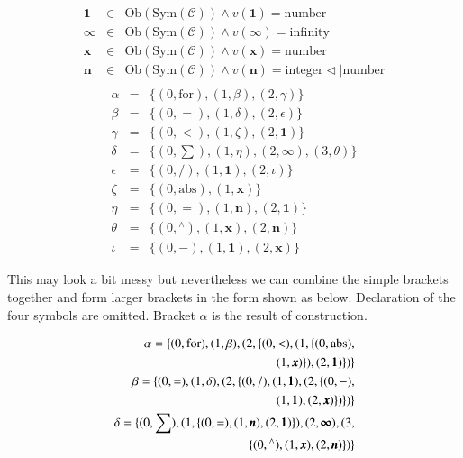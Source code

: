 \documentclass{aims}
\numberwithin{equation}{section}
\numberwithin{theorem}{section}	%
\numberwithin{axiom}{section}	%
\numberwithin{definition}{section}	%
\begin{document}
	\begin{equation*}
		\begin{aligned}
			\pmb{1} &\in& \text{Ob}(\text{Sym}(\mathcal{C}))\land \mathit{v}(\pmb{1})=\text{number}\\
			\pmb{\infty } &\in& \text{Ob}(\text{Sym}(\mathcal{C}))\land \mathit{v}(\pmb{\infty })=\text{infinity}\\
			\pmb{x} &\in& \text{Ob}(\text{Sym}(\mathcal{C}))\land \mathit{v}(\pmb{x})=\text{number}\\
			\pmb{n} &\in& \text{Ob}(\text{Sym}(\mathcal{C}))\land \mathit{v}(\pmb{n})=\text{integer}\triangleleft |\text{number}\\
		\end{aligned}
	\end{equation*}
	\begin{equation*}
		\begin{aligned}
			\alpha &=& \{(0,\text{for}),(1,\beta ),(2,\gamma )\}\\
			\beta &=& \{(0,=),(1,\delta ),(2,\epsilon )\}\\
			\gamma &=& \{(0,<),(1,\zeta ),(2,\pmb{1})\}\\
			\delta &=& \{(0,\sum ),(1,\eta ),(2,\pmb{\infty }), (3,\theta )\}\\
			\epsilon &=& \{(0,/),(1,\pmb{1}),(2,\iota )\}\\
			\zeta &=& \{(0,\text{abs}),(1,\pmb{x})\}\\
			\eta &=& \{(0,=),(1,\pmb{n}),(2,\pmb{1})\}\\
			\theta &=& \{(0,{}^{\wedge}),(1,\pmb{x}),(2,\pmb{n})\}\\
			\iota &=& \{(0,-),(1,\pmb{1}),(2,\pmb{x})\}
		\end{aligned}
	\end{equation*}
	
	This may look a bit messy but nevertheless we can combine the simple brackets together and form larger brackets in the form shown as below. Declaration of the four symbols are omitted. Bracket \(\alpha\) is the result of construction.
	
	\begin{equation}
		\begin{split}
			\alpha = \{(0,\text{for}),(1,\beta ),(2,\{(0,<),(1,\{(0,\text{abs}),\\(1,\pmb{x})\}),(2,\pmb{1})\})\}\hfill\\
			\beta = \{(0,=),(1,\delta ),(2,\{(0,/),(1,\pmb{1}),(2,\{(0,-),\\(1,\pmb{1}),(2,\pmb{x})\})\})\}\hfill\\
			\delta = \{(0,\sum ),(1,\{(0,=),(1,\pmb{n}),(2,\pmb{1})\}),(2,\pmb{\infty }), (3,\\\{(0,{}^{\wedge}),(1,\pmb{x}),(2,\pmb{n})\})\}\hfill\\
		\end{split}
	\end{equation}
	
\end{document}
